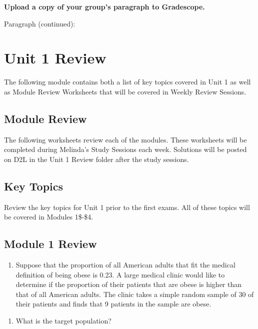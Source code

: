 \documentclass[
]{report}
\providecommand{\tightlist}{%
  \setlength{\itemsep}{0pt}\setlength{\parskip}{0pt}}
\begin{document}
\textbf{Upload a copy of your group's paragraph to Gradescope.}

\newpage

Paragraph (continued):

\newpage

\chapter{Unit 1 Review}\label{unit-1-review}

The following module contains both a list of key topics covered in Unit 1 as well as Module Review Worksheets that will be covered in Weekly Review Sessions.

\section{Module Review}\label{module-review}


The following worksheets review each of the modules. These worksheets will be completed during Melinda's Study Sessions each week. Solutions will be posted on D2L in the Unit 1 Review folder after the study sessions.

\section{Key Topics}\label{key-topics-4}

Review the key topics for Unit 1 prior to the first exams. All of these topics will be covered in Modules 1\$-\$4.

\newpage

\section{Module 1 Review}\label{module-1-review}

\begin{enumerate}
\def\labelenumi{\arabic{enumi}.}
\tightlist
\item
  Suppose that the proportion of all American adults that fit the medical definition of being obese is 0.23. A large medical clinic would like to determine if the proportion of their patients that are obese is higher than that of all American adults. The clinic takes a simple random sample of 30 of their patients and finds that 9 patients in the sample are obese.
\end{enumerate}

\begin{enumerate}
\def\labelenumi{\alph{enumi}.}
\tightlist
\item
  What is the target population?
\end{enumerate}
\end{document}
